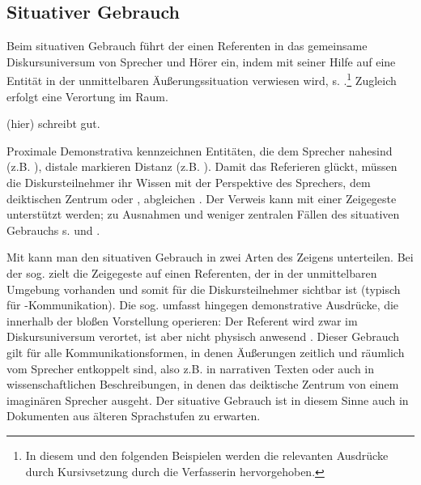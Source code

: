 \subsection{Situativer Gebrauch}\label{sec:situativ}\largerpage

Beim situativen  Gebrauch \parencite[auch deiktischer Gebrauch, z.B. bei][]{Bisle-Muller1991,Consten2004,Studler2011} führt der  einen Referenten in das gemeinsame Diskursuniversum von Sprecher und Hörer ein, indem mit seiner Hilfe auf eine Entität in der unmittelbaren Äußerungssituation verwiesen wird, s. .\footnote{In diesem und den folgenden Beispielen werden die relevanten Ausdrücke durch Kursivsetzung durch die Verfasserin hervorgehoben.}  Zugleich erfolgt eine Verortung im Raum.

\begin{exe}
	\ex \label{ex:deikt}  (hier) schreibt gut.
\end{exe}

Proximale Demonstrativa  kennzeichnen Entitäten, die dem Sprecher nahe\linebreak sind (z.B. ), distale markieren Distanz (z.B. ).
Damit das Referieren glückt, müssen die Diskursteilnehmer ihr Wissen mit der Perspektive des Sprechers, dem deiktischen Zentrum oder   \parencite{Buhler1934}, abgleichen  \parencite[s. auch][327--330]{Hoffmann2009}. Der Verweis kann mit einer Zeigegeste unterstützt werden; zu Ausnahmen und weniger zentralen Fällen des situativen  Gebrauchs s. \textcite[94--95]{Diessel1999} und \textcite[219--224]{Himmelmann1996}. 

Mit \textcite[]{Buhler1934} kann man den situativen  Gebrauch in zwei Arten des Zeigens unterteilen. Bei der sog.  zielt die Zeigegeste auf einen Referenten, der in der unmittelbaren Umgebung vorhanden und somit für die Diskursteilnehmer sichtbar ist (typisch für -Kommunikation). Die sog.  umfasst hingegen demonstrative Ausdrücke, die innerhalb der bloßen Vorstellung operieren: Der Referent wird zwar im Diskursuniversum verortet, ist aber nicht physisch anwesend \parencite[s. auch][222]{Himmelmann1996}. Dieser Gebrauch gilt für alle Kommunikationsformen, in denen Äußerungen zeitlich und räumlich vom Sprecher entkoppelt sind, also z.B. in narrativen Texten \parencite[95]{Diessel1999} oder auch in wissenschaftlichen Beschreibungen, in denen das deiktische Zentrum von einem imaginären Sprecher ausgeht. Der situative  Gebrauch ist in diesem Sinne auch in Dokumenten aus älteren Sprachstufen zu erwarten. 

